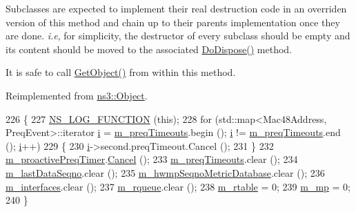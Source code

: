 Subclasses are expected to implement their real destruction code in an overriden version of this method and chain up to their parent\textquotesingle{}s implementation once they are done. {\itshape i.\+e}, for simplicity, the destructor of every subclass should be empty and its content should be moved to the associated \hyperlink{classns3_1_1dot11s_1_1HwmpProtocol_aac4d06dc3a17b2afbe75104b78f1363a}{Do\+Dispose()} method.

It is safe to call \hyperlink{classns3_1_1Object_a13e18c00017096c8381eb651d5bd0783}{Get\+Object()} from within this method. 

Reimplemented from \hyperlink{classns3_1_1Object_a475d429a75d302d4775f4ae32479b287}{ns3\+::\+Object}.


\begin{DoxyCode}
226 \{
227   \hyperlink{log-macros-disabled_8h_a90b90d5bad1f39cb1b64923ea94c0761}{NS\_LOG\_FUNCTION} (\textcolor{keyword}{this});
228   \textcolor{keywordflow}{for} (std::map<Mac48Address, PreqEvent>::iterator \hyperlink{bernuolliDistribution_8m_a6f6ccfcf58b31cb6412107d9d5281426}{i} = \hyperlink{classns3_1_1dot11s_1_1HwmpProtocol_a8965b53a5ae63807e2bcf0faaa4a6dc2}{m\_preqTimeouts}.begin (); 
      \hyperlink{bernuolliDistribution_8m_a6f6ccfcf58b31cb6412107d9d5281426}{i} != \hyperlink{classns3_1_1dot11s_1_1HwmpProtocol_a8965b53a5ae63807e2bcf0faaa4a6dc2}{m\_preqTimeouts}.end (); \hyperlink{bernuolliDistribution_8m_a6f6ccfcf58b31cb6412107d9d5281426}{i}++)
229     \{
230       \hyperlink{bernuolliDistribution_8m_a6f6ccfcf58b31cb6412107d9d5281426}{i}->second.preqTimeout.Cancel ();
231     \}
232   \hyperlink{classns3_1_1dot11s_1_1HwmpProtocol_a9788adc340b2abf12aae651c911bd74f}{m\_proactivePreqTimer}.\hyperlink{classns3_1_1EventId_a993ae94e48e014e1afd47edb16db7a11}{Cancel} ();
233   \hyperlink{classns3_1_1dot11s_1_1HwmpProtocol_a8965b53a5ae63807e2bcf0faaa4a6dc2}{m\_preqTimeouts}.clear ();
234   \hyperlink{classns3_1_1dot11s_1_1HwmpProtocol_aeb887a8a8e95dcfc1ed9f37cbbe1a97c}{m\_lastDataSeqno}.clear ();
235   \hyperlink{classns3_1_1dot11s_1_1HwmpProtocol_afcff65dd692f7524ea04f46d2cfc7990}{m\_hwmpSeqnoMetricDatabase}.clear ();
236   \hyperlink{classns3_1_1dot11s_1_1HwmpProtocol_ae2cee085d1d2b9d32b509b710c0b4511}{m\_interfaces}.clear ();
237   \hyperlink{classns3_1_1dot11s_1_1HwmpProtocol_ad7a0b41b6f5ec7583e8fbda2197d345f}{m\_rqueue}.clear ();
238   \hyperlink{classns3_1_1dot11s_1_1HwmpProtocol_a12fda0e3e5a400888c8ba1a87c1a7216}{m\_rtable} = 0;
239   \hyperlink{classns3_1_1MeshL2RoutingProtocol_af4ebb2340b72dfc607ddf3c1ae65b54a}{m\_mp} = 0;
240 \}
\end{DoxyCode}


